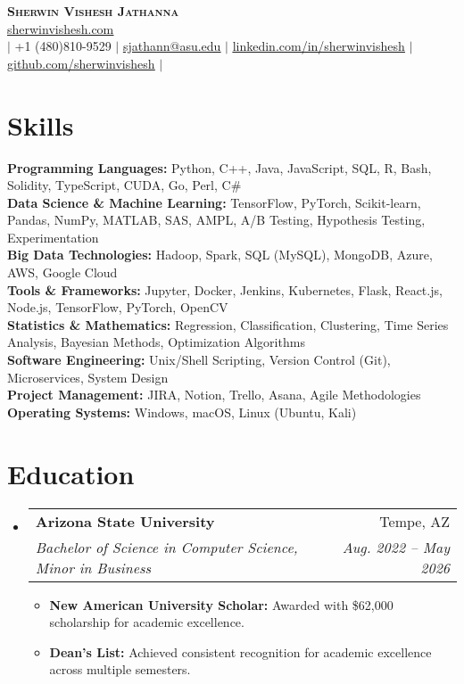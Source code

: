 \documentclass[letterpaper,11pt]{article}
\makeatletter
\newcommand{\resumeItem}[1]{
  \item\small{
    {#1 \vspace{-2pt}}
  }
}
\newcommand{\resumeSubheading}[4]{
  \vspace{-2pt}\item
    \begin{tabular*}{0.97\textwidth}[t]{l@{\extracolsep{\fill}}r}
      \textbf{#1} & #2 \\
      \textit{\small#3} & \textit{\small #4} \\
    \end{tabular*}\vspace{-7pt}
}
\newcommand{\resumeSubHeadingListStart}{\begin{itemize}[leftmargin=0.15in, label={}]}
\newcommand{\resumeSubHeadingListEnd}{\end{itemize}}
\newcommand{\resumeItemListStart}{\begin{itemize}}
\newcommand{\resumeItemListEnd}{\end{itemize}\vspace{-5pt}}
\makeatother
\begin{document}
\begin{center}
    \textbf{\Huge \scshape Sherwin Vishesh Jathanna} \\ \vspace{1pt}
    \href{https://sherwinvishesh.com}{\underline{sherwinvishesh.com}} 
   \\ \small $|$ +1 (480)810-9529 $|$ \href{mailto:sjathann@asu.edu}{\underline{sjathann@asu.edu}} $|$ 
    \href{https://linkedin.com/in/sherwinvishesh}{\underline{linkedin.com/in/sherwinvishesh}} $|$
    \href{https://github.com/sherwinvishesh}{\underline{github.com/sherwinvishesh}} $|$
\end{center}

\section{Skills}
 \begin{itemize}[leftmargin=0.15in, label={}]
    \small{\item{
     \textbf{Programming Languages:}{ Python, C++, Java, JavaScript, SQL, R, Bash, Solidity, TypeScript, CUDA, Go, Perl, C#} \\
     \textbf{Data Science \& Machine Learning:}{ TensorFlow, PyTorch, Scikit-learn, Pandas, NumPy, MATLAB, SAS, AMPL, A/B Testing, Hypothesis Testing, Experimentation} \\
     \textbf{Big Data Technologies:}{ Hadoop, Spark, SQL (MySQL), MongoDB, Azure, AWS, Google Cloud} \\
     \textbf{Tools \& Frameworks:}{ Jupyter, Docker, Jenkins, Kubernetes, Flask, React.js, Node.js, TensorFlow, PyTorch, OpenCV} \\
     \textbf{Statistics \& Mathematics:}{ Regression, Classification, Clustering, Time Series Analysis, Bayesian Methods, Optimization Algorithms} \\
     \textbf{Software Engineering:}{ Unix/Shell Scripting, Version Control (Git), Microservices, System Design} \\
     \textbf{Project Management:}{ JIRA, Notion, Trello, Asana, Agile Methodologies} \\
     \textbf{Operating Systems:}{ Windows, macOS, Linux (Ubuntu, Kali)}
    }}
 \end{itemize}

\section{Education}
  \resumeSubHeadingListStart
    \resumeSubheading
      {Arizona State University}{Tempe, AZ}
      {Bachelor of Science in Computer Science, Minor in Business}{Aug. 2022 -- May 2026}
      \resumeItemListStart
        \resumeItem{\textbf{New American University Scholar:} Awarded with \$62,000 scholarship for academic excellence.}
        \resumeItem{\textbf{Dean’s List:} Achieved consistent recognition for academic excellence across multiple semesters.}      
      \resumeItemListEnd
\resumeSubHeadingListEnd
\end{document}
